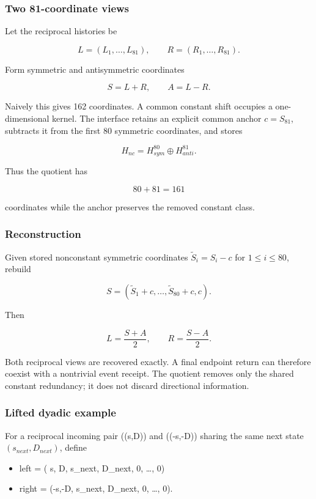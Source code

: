 \subsubsection{Two 81-coordinate views}\label{viii-ch04-two-81-coordinate-views}

Let the reciprocal histories be

\[
L=(L_1,\ldots,L_{81}),\qquad
R=(R_1,\ldots,R_{81}).
\]

Form symmetric and antisymmetric coordinates

\[
S=L+R,
\qquad
A=L-R.
\]

Naively this gives 162 coordinates. A common constant shift occupies a
one-dimensional kernel. The interface retains an explicit common anchor
\(c=S_{81}\), subtracts it from the first 80 symmetric coordinates, and
stores

\[
H_{nc}=H_{sym}^{80}\oplus H_{anti}^{81}.
\]

Thus the quotient has

\[
80+81=161
\]

coordinates while the anchor preserves the removed constant class.

\subsubsection{Reconstruction}\label{viii-ch04-reconstruction}

Given stored nonconstant symmetric coordinates \(\widetilde S_i=S_i-c\)
for \(1\le i\le80\), rebuild

\[
S=(\widetilde S_1+c,\ldots,\widetilde S_{80}+c,c).
\]

Then

\[
L=\frac{S+A}{2},
\qquad
R=\frac{S-A}{2}.
\]

Both reciprocal views are recovered exactly. A final endpoint return can
therefore coexist with a nontrivial event receipt. The quotient removes
only the shared constant redundancy; it does not discard directional
information.

\subsubsection{Lifted dyadic example}\label{viii-ch04-lifted-dyadic-example}

For a reciprocal incoming pair ((s,D)) and ((-s,-D)) sharing the same
next state \((s_{next},D_{next})\), define

\begin{itemize}
\tightlist
\item
  left = ( s, D, s\_next, D\_next, 0, \ldots, 0)
\item
  right = (-s,-D, s\_next, D\_next, 0, \ldots, 0).
\end{itemize}

